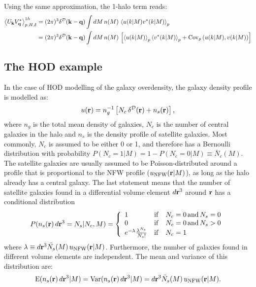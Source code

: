 \documentclass{article}
\begin{document}
Using the same approximation, the 1-halo term reads:
\begin{align}
  \left\langle U_{\bf k}V^*_{\bf q}\right\rangle_{p,H,\delta}^{1h}&=(2\pi)^3\delta^{\cal D}({\bf k}-{\bf q})\int dM\,n(M)\,\left\langle u(k|M) v^*(k|M)\right\rangle_p\\
  &=(2\pi)^3\delta^{\cal D}({\bf k}-{\bf q})\int dM\,n(M)\,\left[\left\langle u(k|M)\right\rangle_p\left\langle v^*(k|M)\right\rangle_p+{\rm Cov}_p\left(u(k|M),v(k|M)\right)\right]
\end{align}

\subsection{The HOD example}
In the case of HOD modelling of the galaxy overdensity, the galaxy density profile is modelled as:
\begin{equation}
  u({\bf r})=n_g^{-1}\left[N_c\,\delta^{\cal D}({\bf r})+n_s({\bf r})\right],
\end{equation}
where $n_g$ is the total mean density of galaxies, $N_c$ is the number of central galaxies in the halo and $n_s$ is the density profile of satellite galaxies. Most commonly, $N_c$ is assumed to be either 0 or 1, and therefore has a Bernoulli distribution with probability $P(N_c=1|M)=1-P(N_c=0|M)\equiv \bar{N}_c(M)$. The satellite galaxies are usually assumed to be Poisson-distributed around a profile that is proportional to the NFW profile ($u_{\rm NFW}({\bf r}|M)$), as long as the halo already has a central galaxy. The last statement means that the number of satellite galaxies found in a differential volume element $d{\bf r}^3$ around ${\bf r}$ has a conditional distribution
\begin{equation}
 P(n_s({\bf r})\,d{\bf r}^3=N_s|N_c,M)=
 \left\{\begin{array}{lll}
          1 & {\rm if} & N_c=0\,{\rm and}\,N_s=0\\
          0 & {\rm if} & N_c=0\,{\rm and}\,N_s>0\\
          e^{-\lambda}\frac{\lambda^{N_s}}{N_s!} & {\rm if} & N_c=1
        \end{array}\right.
\end{equation}
where $\lambda\equiv d{\bf r}^3\bar{N_s}(M)\,u_{\rm NFW}({\bf r}|M)$. Furthermore, the number of galaxies found in different volume elements are independent. The mean and variance of this distribution are:
\begin{equation}
 {\rm E}(n_s({\bf r})\,d{\bf r}^3|M)={\rm Var}(n_s({\bf r})\,d{\bf r}^3|M)=d{\bf r}^3 \bar{N}_s(M)\,u_{\rm NFW}({\bf r}|M).
\end{equation}
\end{document}
